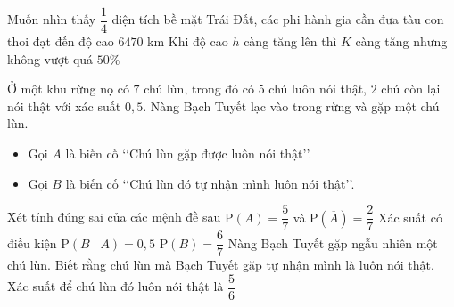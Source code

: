 \begin{ex}
	{Muốn nhìn thấy $\dfrac{1}{4}$ diện tích bề mặt Trái Đất, các phi hành gia cần đưa tàu con thoi đạt đến độ cao $6470$ km}
	{\True Khi độ cao $h$ càng tăng lên thì $K$ càng tăng nhưng không vượt quá $50\%$}
\end{ex}
\begin{ex}%
	Ở một khu rừng nọ có $7$ chú lùn, trong đó có $5$ chú luôn nói thật, $2$ chú còn lại nói thật với xác suất $0{,}5$. Nàng Bạch Tuyết lạc vào trong rừng và gặp một chú lùn.
	\begin{itemize}
		\item Gọi $A$ là biến cố \lq\lq Chú lùn gặp được luôn nói thật\rq\rq.
		\item Gọi $B$ là biến cố \lq\lq Chú lùn đó tự nhận mình luôn nói thật\rq\rq.
	\end{itemize}
	Xét tính đúng sai của các mệnh đề sau\vspace{5pt}
	\choiceTF
	{\True $\mathrm{P}(A)=\dfrac{5}{7}$ và $\mathrm{P}(\overline{A})=\dfrac{2}{7}$}
	{Xác suất có điều kiện $\mathrm{P}(B\mid A)=0{,}5$}
	{\True $\mathrm{P}(B)=\dfrac{6}{7}$}
	{\True Nàng Bạch Tuyết gặp ngẫu nhiên một chú lùn. Biết rằng chú lùn mà Bạch Tuyết gặp tự nhận mình là luôn nói thật. Xác suất để chú lùn đó luôn nói thật là $\dfrac{5}{6}$}
\end{ex}
